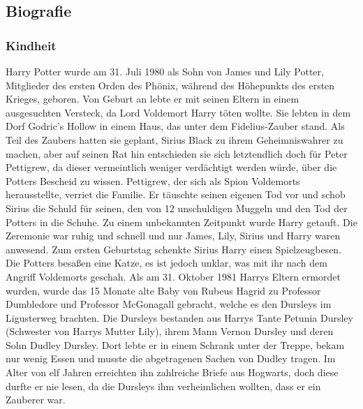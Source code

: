 \documentclass[a4paper, 10pt]{article}
\begin{document}
\subsection*{\Large Biografie}
\vspace{5pt}
\subsubsection*{\large Kindheit}
Harry Potter wurde am 31. Juli 1980 als Sohn von James und Lily Potter, Mitglieder des ersten Orden des Phönix, während des Höhepunkts des ersten Krieges, geboren. Von Geburt an lebte er mit seinen Eltern in einem ausgesuchten Versteck, da Lord Voldemort Harry töten wollte. Sie lebten in dem Dorf Godric's Hollow in einem Haus, das unter dem Fidelius-Zauber stand. Als Teil des Zaubers hatten sie geplant, Sirius Black zu ihrem Geheimniswahrer zu machen, aber auf seinen Rat hin entschieden sie sich letztendlich doch für Peter Pettigrew, da dieser vermeintlich weniger verdächtigt werden würde, über die Potters Bescheid zu wissen. Pettigrew, der sich als Spion Voldemorts herausstellte, verriet die Familie. Er täuschte seinen eigenen Tod vor und schob Sirius die Schuld für seinen, den von 12 unschuldigen Muggeln und den Tod der Potters in die Schuhe.
\vspace{10pt}
\newline
{}  
Zu einem unbekannten Zeitpunkt wurde Harry getauft. Die Zeremonie war ruhig und schnell und nur James, Lily, Sirius und Harry waren anwesend. Zum ersten Geburtstag schenkte Sirius Harry einen Spielzeugbesen.
\vspace{10pt}
\newline
{}  
Die Potters besaßen eine Katze, es ist jedoch unklar, was mit ihr nach dem Angriff Voldemorts geschah.
\vspace{10pt}
\newline
{}  
Als am 31. Oktober 1981 Harrys Eltern ermordet wurden, wurde das 15 Monate alte Baby von Rubeus Hagrid zu Professor Dumbledore und Professor McGonagall gebracht, welche es den Dursleys im Ligusterweg brachten. Die Dursleys bestanden aus Harrys Tante Petunia Dursley (Schwester von Harrys Mutter Lily), ihrem Mann Vernon Dursley und deren Sohn Dudley Dursley.
\vspace{10pt}
\newline
{}  
Dort lebte er in einem Schrank unter der Treppe, bekam nur wenig Essen und musste die abgetragenen Sachen von Dudley tragen. Im Alter von elf Jahren erreichten ihn zahlreiche Briefe aus Hogwarts, doch diese durfte er nie lesen, da die Dursleys ihm verheimlichen wollten, dass er ein Zauberer war.
\end{document}
